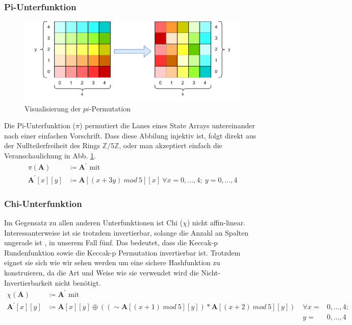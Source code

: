 \subsubsection{Pi-Unterfunktion}
\begin{figure}
    \center
    \includegraphics{images/pi.pdf}
    \caption{Visualisierung der $pi$-Permutation}
    \label{fig:definition_pi}
\end{figure}
Die Pi-Unterfunktion ($\pi$) permutiert die Lanes eines State Arrays untereinander nach einer einfachen Vorschrift.
Dass diese Abbilung injektiv ist, folgt direkt aus der Nullteilerfreiheit des Rings $\mathbb{Z}/5\mathbb{Z}$,
oder man akzeptiert einfach die Veranschaulichung in Abb. \ref{fig:definition_pi}.
\begin{align*}
    \pi (\textbf{A}) & \coloneq \textbf{A}^\prime \text{ mit } \\
    \textbf{A}^\prime[x][y] & \coloneq \textbf{A}[(x + 3y)\ mod\ 5][x]\ \forall x = 0,...,4;\ y = 0,...,4
\end{align*}

\subsubsection{Chi-Unterfunktion}
Im Gegensatz zu allen anderen Unterfunktionen ist Chi ($\chi$) nicht affin-linear.
Interessanterweise ist sie trotzdem invertierbar, solange die Anzahl an Spalten ungerade ist , in unserem Fall fünf. 
Das bedeutet, dass die Keccak-p Rundenfunktion sowie die Keccak-p Permutation invertierbar ist.
Trotzdem eignet sie sich wie wir sehen werden um eine sichere Hashfunktion zu konstruieren,
da die Art und Weise wie sie verwendet wird die Nicht-Invertierbarkeit nicht benötigt.
\begin{align*}
    \chi (\textbf{A}) & \coloneq \textbf{A}^\prime \text{ mit } \\
    \textbf{A}^\prime[x][y] & \coloneq \textbf{A}[x][y] \oplus ((\sim \textbf{A}[(x + 1)\ mod\ 5][y]) * \textbf{A}[(x + 2)\ mod\ 5][y])\ & \forall x = & 0,...,4;\\
    && y = & 0,...,4
\end{align*}

